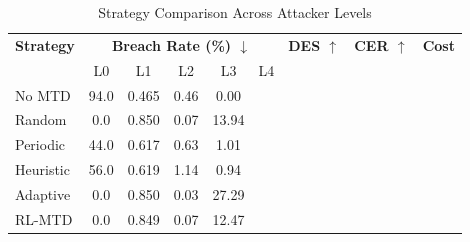 \begin{table}[t]
\centering
\caption{Strategy Comparison Across Attacker Levels}
\label{tab:strategy_comparison}
\begin{tabular}{l|ccccc|ccc}
\hline
\textbf{Strategy} & \multicolumn{5}{c|}{\textbf{Breach Rate (\%) $\downarrow$}} & \textbf{DES $\uparrow$} & \textbf{CER $\uparrow$} & \textbf{Cost} \\
 & L0 & L1 & L2 & L3 & L4 & & & \\
\hline
No MTD & 94.0 & 0.465 & 0.46 & 0.00 \\
Random & 0.0 & 0.850 & 0.07 & 13.94 \\
Periodic & 44.0 & 0.617 & 0.63 & 1.01 \\
Heuristic & 56.0 & 0.619 & 1.14 & 0.94 \\
Adaptive & 0.0 & 0.850 & 0.03 & 27.29 \\
RL-MTD & 0.0 & 0.849 & 0.07 & 12.47 \\
\hline
\end{tabular}
\end{table}
